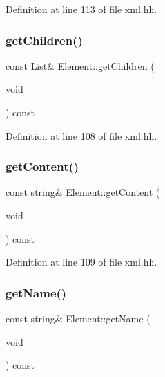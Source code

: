 Definition at line 113 of file xml.\+hh.

\mbox{\label{class_element_ad3279a8cab4c21c79abb3c20f706ffca}} 
\subsubsection{\texorpdfstring{getChildren()}{getChildren()}}
{\footnotesize\ttfamily const \mbox{\hyperlink{xml_8hh_ab5ab62f46b3735557c125f91b40ac155}{List}}\& Element\+::get\+Children (\begin{DoxyParamCaption}\item[{void}]{ }\end{DoxyParamCaption}) const\hspace{0.3cm}{\ttfamily [inline]}}



Definition at line 108 of file xml.\+hh.

\mbox{\label{class_element_a97102776a2f1831f3ff63a3b8baf9fdb}} 
\subsubsection{\texorpdfstring{getContent()}{getContent()}}
{\footnotesize\ttfamily const string\& Element\+::get\+Content (\begin{DoxyParamCaption}\item[{void}]{ }\end{DoxyParamCaption}) const\hspace{0.3cm}{\ttfamily [inline]}}



Definition at line 109 of file xml.\+hh.

\mbox{\label{class_element_a7b3e52639fcd08f69cc7480dfe9fd3b2}} 
\subsubsection{\texorpdfstring{getName()}{getName()}}
{\footnotesize\ttfamily const string\& Element\+::get\+Name (\begin{DoxyParamCaption}\item[{void}]{ }\end{DoxyParamCaption}) const\hspace{0.3cm}{\ttfamily [inline]}}




